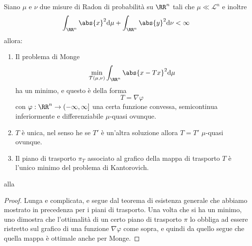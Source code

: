 \documentclass[11pt]{scrartcl}
\newcommand{\dif}{\text{d}}
\begin{document}
	\begin{theorem}[Brenier, 1991]
		Siano $\mu$ e $\nu$ due misure di Radon di probabilità su $\RR^n$ tali che $\mu\ll \mathscr{L}^n$ e inoltre
		$$\int_{\RR^n} \abs{x}^2\dif \mu+\int_{\RR^n}\abs{y}^2\dif \nu<\infty$$
		allora:
		\begin{enumerate}
			\item Il problema di Monge 
			$$\min_{\mathcal{T}(\mu,\nu)}\int_{\RR^n}\abs{x-Tx}^2\dif \mu$$
			ha un minimo, e questo è della forma
			$$T=\nabla \varphi$$
			con $\varphi:\RR^n\to(-\infty,\infty]$ una certa funzione convessa, semicontinua inferiormente e differenziabile $\mu$-quasi ovunque. 
			\item $T$ è unica, nel senso he se $T'$ è un'altra soluzione allora $T=T'$ $\mu$-quasi ovunque.
			\item Il piano di trasporto $\pi_T$ associato al grafico della mappa di trasporto $T$ è l'unico minimo del problema di Kantorovich. 
		\end{enumerate}
	\end{theorem}alla
	\begin{proof}
		Lunga e complicata, e segue dal teorema di esistenza generale che abbiamo mostrato in precedenza per i piani di trasporto. Una volta che si ha un minimo, uno dimostra che l'ottimalità di un certo piano di trasporto $\pi$ lo obbliga ad essere ristretto sul grafico di una funzione $\nabla \varphi$ come sopra, e quindi da quello segue che quella mappa è ottimale anche per Monge.
	\end{proof}
	
\end{document}
